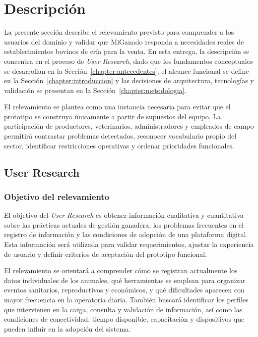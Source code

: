 \chapter{Descripci\'on}\label{chapter:descripcion}

La presente secci\'on describe el relevamiento previsto para comprender a los usuarios del dominio y validar que MiGanado responda a necesidades reales de establecimientos bovinos de cr\'ia para la venta. En esta entrega, la descripci\'on se concentra en el proceso de \emph{User Research}, dado que los fundamentos conceptuales se desarrollan en la Secci\'on~\ref{chapter:antecedentes}, el alcance funcional se define en la Secci\'on~\ref{chapter:introduccion} y las decisiones de arquitectura, tecnolog\'ias y validaci\'on se presentan en la Secci\'on~\ref{chapter:metodologia}.

El relevamiento se plantea como una instancia necesaria para evitar que el prototipo se construya \'unicamente a partir de supuestos del equipo. La participaci\'on de productores, veterinarios, administradores y empleados de campo permitir\'a contrastar problemas detectados, reconocer vocabulario propio del sector, identificar restricciones operativas y ordenar prioridades funcionales.

\section{User Research}

\subsection{Objetivo del relevamiento}

El objetivo del \emph{User Research} es obtener informaci\'on cualitativa y cuantitativa sobre las pr\'acticas actuales de gesti\'on ganadera, los problemas frecuentes en el registro de informaci\'on y las condiciones de adopci\'on de una plataforma digital. Esta informaci\'on ser\'a utilizada para validar requerimientos, ajustar la experiencia de usuario y definir criterios de aceptaci\'on del prototipo funcional.

El relevamiento se orientar\'a a comprender c\'omo se registran actualmente los datos individuales de los animales, qu\'e herramientas se emplean para organizar eventos sanitarios, reproductivos y econ\'omicos, y qu\'e dificultades aparecen con mayor frecuencia en la operatoria diaria. Tambi\'en buscar\'a identificar los perfiles que intervienen en la carga, consulta y validaci\'on de informaci\'on, as\'i como las condiciones de conectividad, tiempo disponible, capacitaci\'on y dispositivos que pueden influir en la adopci\'on del sistema.

